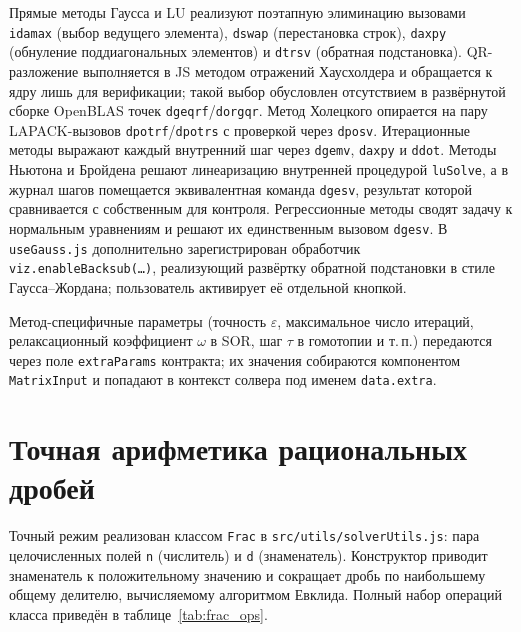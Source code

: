 \documentclass[12pt, oneside]{book}
\begin{document}
    \quad Прямые методы Гаусса и LU реализуют поэтапную элиминацию вызовами \texttt{idamax} (выбор ведущего элемента), \texttt{dswap} (перестановка строк), \texttt{daxpy} (обнуление поддиагональных элементов) и \texttt{dtrsv} (обратная подстановка). QR-разложение выполняется в JS методом отражений Хаусхолдера и обращается к ядру лишь для верификации; такой выбор обусловлен отсутствием в развёрнутой сборке OpenBLAS точек \texttt{dgeqrf}/\texttt{dorgqr}. Метод Холецкого опирается на пару LAPACK-вызовов \texttt{dpotrf}/\texttt{dpotrs} с проверкой через \texttt{dposv}. Итерационные методы выражают каждый внутренний шаг через \texttt{dgemv}, \texttt{daxpy} и \texttt{ddot}. Методы Ньютона и Бройдена решают линеаризацию внутренней процедурой \texttt{luSolve}, а в журнал шагов помещается эквивалентная команда \texttt{dgesv}, результат которой сравнивается с собственным для контроля. Регрессионные методы сводят задачу к нормальным уравнениям и решают их единственным вызовом \texttt{dgesv}. В \texttt{useGauss.js} дополнительно зарегистрирован обработчик\\ \texttt{viz.enableBacksub(\ldots)}, реализующий развёртку обратной подстановки в стиле Гаусса--Жордана; пользователь активирует её отдельной кнопкой.

    \quad Метод-специфичные параметры (точность $\varepsilon$, максимальное число итераций, релаксационный коэффициент $\omega$ в SOR, шаг $\tau$ в гомотопии и т.\,п.) передаются через поле \texttt{extra\-Params} контракта; их значения собираются компонентом \texttt{MatrixInput} и попадают в контекст солвера под именем \texttt{data.extra}.

\section{Точная арифметика рациональных дробей}

    \quad Точный режим реализован классом \texttt{Frac} в \texttt{src/utils/solverUtils.js}: пара целочисленных полей \texttt{n} (числитель) и \texttt{d} (знаменатель). Конструктор приводит знаменатель к положительному значению и сокращает дробь по наибольшему общему делителю, вычисляемому алгоритмом Евклида. Полный набор операций класса приведён в таблице~\ref{tab:frac_ops}.
\end{document}
